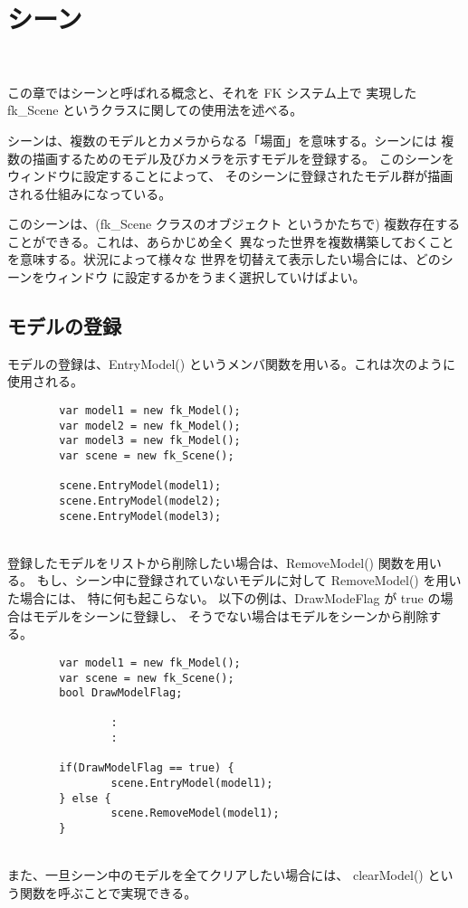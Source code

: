 \chapter{シーン} \label{sec:scene} ~

この章ではシーンと呼ばれる概念と、それを FK システム上で
実現した fk\_Scene というクラスに関しての使用法を述べる。

シーンは、複数のモデルとカメラからなる「場面」を意味する。シーンには
複数の描画するためのモデル及びカメラを示すモデルを登録する。
このシーンをウィンドウに設定することによって、
そのシーンに登録されたモデル群が描画される仕組みになっている。

このシーンは、(fk\_Scene クラスのオブジェクト
というかたちで) 複数存在することができる。これは、あらかじめ全く
異なった世界を複数構築しておくことを意味する。状況によって様々な
世界を切替えて表示したい場合には、どのシーンをウィンドウ
に設定するかをうまく選択していけばよい。

\section{モデルの登録}
モデルの登録は、EntryModel() というメンバ関数を用いる。これは次のように
使用される。
\\
\begin{breakbox}
\begin{verbatim}
        var model1 = new fk_Model();
        var model2 = new fk_Model();
        var model3 = new fk_Model();
        var scene = new fk_Scene();

        scene.EntryModel(model1);
        scene.EntryModel(model2);
        scene.EntryModel(model3);
\end{verbatim}
\end{breakbox}
~ \\
登録したモデルをリストから削除したい場合は、RemoveModel() 関数を用いる。
もし、シーン中に登録されていないモデルに対して RemoveModel() を用いた場合には、
特に何も起こらない。
以下の例は、DrawModeFlag が true の場合はモデルをシーンに登録し、
そうでない場合はモデルをシーンから削除する。
\\
\begin{breakbox}
\begin{verbatim}
        var model1 = new fk_Model();
        var scene = new fk_Scene();
        bool DrawModelFlag;

                :
                :

        if(DrawModelFlag == true) {
                scene.EntryModel(model1);
        } else {
                scene.RemoveModel(model1);
        }
\end{verbatim}
\end{breakbox}
~ \\
また、一旦シーン中のモデルを全てクリアしたい場合には、
clearModel() という関数を呼ぶことで実現できる。

